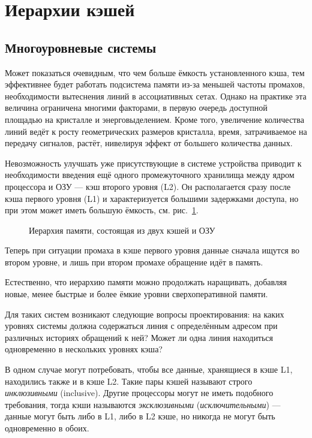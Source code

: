 \section{Иерархии кэшей}

\subsection{Многоуровневые системы}

Может показаться очевидным, что чем больше ёмкость установленного кэша, тем эффективнее будет работать подсистема памяти из-за меньшей частоты промахов, необходимости вытеснения линий в ассоциативных сетах. Однако на практике эта величина ограничена многими факторами, в первую очередь доступной площадью на кристалле и энерговыделением. Кроме того, увеличение количества линий ведёт к росту геометрических размеров кристалла, время, затрачиваемое на передачу сигналов, растёт, нивелируя эффект от большего количества данных.

Невозможность улучшать уже присутствующие в системе устройства приводит к необходимости введения ещё одного промежуточного хранилища между ядром процессора и ОЗУ --- кэш второго уровня (L2). Он располагается сразу после кэша первого уровня (L1) и характеризуется большими задержками доступа, но при этом может иметь большую ёмкость, см. рис.~\ref{fig:l1l2}.

\begin{figure}[htb]
    \centering
    \caption{Иерархия памяти, состоящая из двух кэшей и ОЗУ}
    \label{fig:l1l2}
\end{figure}


Теперь при ситуации промаха в кэше первого уровня данные сначала ищутся во втором уровне, и лишь при втором промахе обращение идёт в память. 

Естественно, что иерархию памяти можно продолжать наращивать, добавляя новые, менее быстрые и более ёмкие уровни сверхоперативной памяти. %

Для таких систем возникают следующие вопросы проектирования: на каких уровнях системы должна содержаться линия с определённым адресом при различных историях обращений к ней? Может ли одна линия находиться одновременно в нескольких уровнях кэша?

В одном случае могут потребовать, чтобы все данные, хранящиеся в кэше L1, находились также и в кэше L2. Такие пары кэшей называют строго \textit{инклюзивными} (\abbr inclusive). Другие процессоры могут не иметь подобного требования, тогда кэши называются \textit{эксклюзивными} (\textit{исключительными})  --- данные могут быть либо в L1, либо в L2 кэше, но никогда не могут быть одновременно в обоих.


